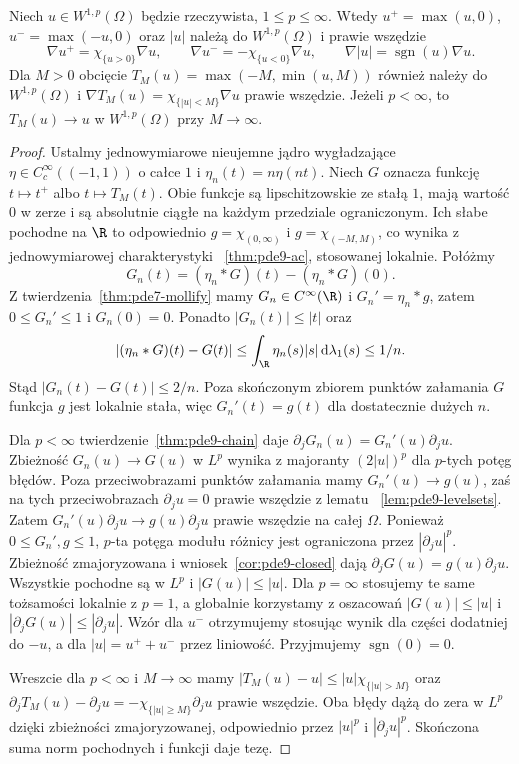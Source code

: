 \begin{wniosek}
\label{cor:pde9-truncation}
Niech $u\in W^{1,p}(\Omega)$ będzie rzeczywista,
$1\le p\le\infty$.
Wtedy $u^+=\max(u,0)$, $u^-=\max(-u,0)$ oraz $|u|$
należą do $W^{1,p}(\Omega)$ i prawie wszędzie
\[
 \nabla u^+=\chi_{\{u>0\}}\nabla u,\qquad
 \nabla u^-=-\chi_{\{u<0\}}\nabla u,\qquad
 \nabla|u|=\operatorname{sgn}(u)\nabla u .
\]
Dla $M>0$ obcięcie $T_M(u)=\max(-M,\min(u,M))$
również należy do $W^{1,p}(\Omega)$ i
$\nabla T_M(u)=\chi_{\{|u|<M\}}\nabla u$ prawie wszędzie.
Jeżeli $p<\infty$, to $T_M(u)\to u$ w $W^{1,p}(\Omega)$
przy $M\to\infty$.
\end{wniosek}
\begin{proof}
Ustalmy jednowymiarowe nieujemne jądro wygładzające
$\eta\in C_c^\infty((-1,1))$ o całce $1$
i $\eta_n(t)=n\eta(nt)$.
Niech $G$ oznacza funkcję $t\mapsto t^+$
albo $t\mapsto T_M(t)$.
Obie funkcje są lipschitzowskie ze stałą $1$,
mają wartość $0$ w zerze i są absolutnie ciągłe
na każdym przedziale ograniczonym.
Ich słabe pochodne na $\R$ to odpowiednio
$g=\chi_{(0,\infty)}$ i $g=\chi_{(-M,M)}$,
co wynika z jednowymiarowej charakterystyki
~\ref{thm:pde9-ac}, stosowanej lokalnie.
Połóżmy
\[
 G_n(t)=(\eta_n*G)(t)-(\eta_n*G)(0).
\]
Z twierdzenia~\ref{thm:pde7-mollify} mamy
$G_n\in C^\infty(\R)$ i $G_n'=\eta_n*g$,
zatem $0\le G_n'\le1$ i $G_n(0)=0$.
Ponadto $|G_n(t)|\le|t|$ oraz
\[
 |(\eta_n*G)(t)-G(t)|
 \le\int_{\R}\eta_n(s)|s|\,\mathrm d\lambda_1(s)\le1/n.
\]
Stąd $|G_n(t)-G(t)|\le2/n$.
Poza skończonym zbiorem punktów załamania $G$
funkcja $g$ jest lokalnie stała, więc
$G_n'(t)=g(t)$ dla dostatecznie dużych $n$.

Dla $p<\infty$ twierdzenie~\ref{thm:pde9-chain} daje
$\partial_j G_n(u)=G_n'(u)\partial_j u$.
Zbieżność $G_n(u)\to G(u)$ w $L^p$ wynika
z majoranty $(2|u|)^p$ dla $p$-tych potęg błędów.
Poza przeciwobrazami punktów załamania mamy
$G_n'(u)\to g(u)$, zaś na tych przeciwobrazach
$\partial_j u=0$ prawie wszędzie z lematu
~\ref{lem:pde9-levelsets}.
Zatem $G_n'(u)\partial_j u\to g(u)\partial_j u$
prawie wszędzie na całej $\Omega$.
Ponieważ $0\le G_n',g\le1$, $p$-ta potęga modułu
różnicy jest ograniczona przez $|\partial_j u|^p$.
Zbieżność zmajoryzowana i wniosek~\ref{cor:pde9-closed}
dają $\partial_j G(u)=g(u)\partial_j u$.
Wszystkie pochodne są w $L^p$ i $|G(u)|\le|u|$.
Dla $p=\infty$ stosujemy te same tożsamości lokalnie
z $p=1$, a globalnie korzystamy z oszacowań
$|G(u)|\le|u|$ i $|\partial_j G(u)|\le|\partial_j u|$.
Wzór dla $u^-$ otrzymujemy stosując wynik dla części
dodatniej do $-u$, a dla $|u|=u^++u^-$ przez liniowość.
Przyjmujemy $\operatorname{sgn}(0)=0$.

Wreszcie dla $p<\infty$ i $M\to\infty$
mamy $|T_M(u)-u|\le|u|\chi_{\{|u|>M\}}$
oraz
$\partial_j T_M(u)-\partial_j u
=-\chi_{\{|u|\ge M\}}\partial_j u$ prawie wszędzie.
Oba błędy dążą do zera w $L^p$ dzięki zbieżności
zmajoryzowanej, odpowiednio przez $|u|^p$
i $|\partial_j u|^p$.
Skończona suma norm pochodnych i funkcji daje tezę.
\end{proof}

